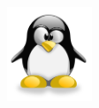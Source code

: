 \documentclass[letterpaper,12pt]{exam}
\begin{document}
\begin{figure}[b]\label{end}
	\center
	\includegraphics[width=1in]{tux}
\end{figure}
\end{document}
